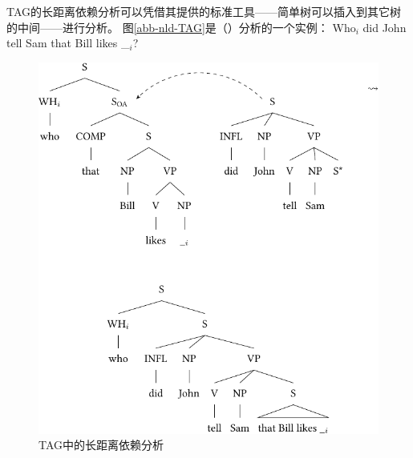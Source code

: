 TAG的长距离依赖分析可以凭借其提供的标准工具——简单树可以插入到其它树的中间——进行分析。
图\vref{abb-nld-TAG}是（）分析的一个实例：
\ea
Who$_i$ did John tell Sam that Bill likes \_$_i$?
\z
%
\begin{figure}
\includegraphics{Figures/tag-long-distance-dependencies-crop}
\caption{\label{abb-nld-TAG}TAG中的长距离依赖分析}
\end{figure}%
